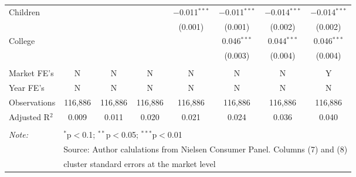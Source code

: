 \begin{table}[!htbp]
\begin{tabular}{@{\extracolsep{5pt}}lccccccc}
  Children &  &  &  & $-$0.011$^{***}$ & $-$0.011$^{***}$ & $-$0.014$^{***}$ & $-$0.014$^{***}$ \\ 
  &  &  &  & (0.001) & (0.001) & (0.002) & (0.002) \\ 
  College &  &  &  &  & 0.046$^{***}$ & 0.044$^{***}$ & 0.046$^{***}$ \\ 
  &  &  &  &  & (0.003) & (0.004) & (0.004) \\ 
 \hline \\[-1.8ex] 
Market FE's & N & N & N & N & N & N & Y \\ 
Year FE's & N & N & N & N & N & N & N \\ 
Observations & 116,886 & 116,886 & 116,886 & 116,886 & 116,886 & 116,886 & 116,886 \\ 
Adjusted R$^{2}$ & 0.009 & 0.011 & 0.020 & 0.021 & 0.024 & 0.036 & 0.040 \\ 
\hline 
\hline \\[-1.8ex] 
\textit{Note:}  & \multicolumn{7}{l}{$^{*}$p$<$0.1; $^{**}$p$<$0.05; $^{***}$p$<$0.01} \\ 
 & \multicolumn{7}{l}{Source: Author calulations from Nielsen Consumer Panel. Columns (7) and (8) } \\ 
 & \multicolumn{7}{l}{cluster standard errors at the market level} \\ 
\end{tabular} 
\end{table} 
